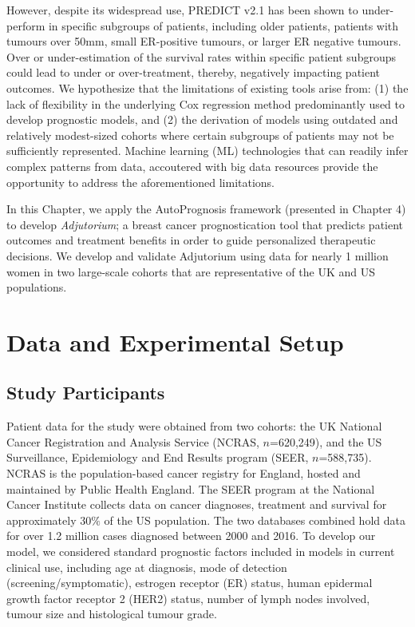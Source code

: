 \documentclass [PhD] {uclathes}
\begin{document}
However, despite its widespread use, PREDICT v2.1 has been shown to under-perform in specific subgroups of patients, including older patients, patients with tumours over 50mm, small ER-positive tumours, or larger ER negative tumours.\cite{van2017validation} Over or under-estimation of the survival rates within specific patient subgroups could lead to under or over-treatment, thereby, negatively impacting patient outcomes.\cite{olivotto2005population,bhoo2012adjuvant,
campbell2009investigation,miao2016validation} We hypothesize that the limitations of existing tools arise from: (1) the lack of flexibility in the underlying Cox regression method predominantly used to develop prognostic models,\cite{ravdin2001computer,dos2017updated} and (2) the derivation of models using outdated and relatively modest-sized cohorts where certain subgroups of patients may not be sufficiently represented. Machine learning (ML) technologies that can readily infer complex patterns from data, accoutered with big data resources provide the opportunity to address the aforementioned limitations.\cite{obermeyer2016predicting,chen2017machine}

In this Chapter, we apply the AutoPrognosis framework (presented in Chapter 4) to develop {\it Adjutorium}; a breast cancer prognostication tool that predicts patient outcomes and treatment benefits in order to guide personalized therapeutic decisions. We develop and validate Adjutorium using data for nearly 1 million women in two large-scale cohorts that are representative of the UK and US populations. 

\section{Data and Experimental Setup}
\label{ch8sec1}
\subsection{Study Participants}
Patient data for the study were obtained from two cohorts: the UK National Cancer Registration and Analysis Service (NCRAS, $n$=620,249), and the US Surveillance, Epidemiology and End Results program\cite{noone2018seer} (SEER, $n$=588,735). NCRAS is the population-based cancer registry for England, hosted and maintained by Public Health England. The SEER program at the National Cancer Institute collects data on cancer diagnoses, treatment and survival for approximately 30$\%$ of the US population. The two databases combined hold data for over 1.2 million cases diagnosed between 2000 and 2016. To develop our model, we considered standard prognostic factors included in models in current clinical use,\cite{dos2017updated,galea1992nottingham, michaelson2011improved} including age at diagnosis, mode of detection (screening/symptomatic), estrogen receptor (ER) status, human epidermal growth factor receptor 2 (HER2) status, number of lymph nodes involved, tumour size and histological tumour grade. 
\end{document}
